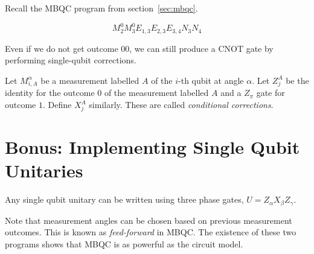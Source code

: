 \documentclass{article}
\begin{document}
Recall the MBQC program from section~\ref{sec:mbqc}.

\[ M_2^0 M_3^0 E_{1,3} E_{2,3} E_{3,4} N_3 N_4 \]

\medskip
{}
\medskip

Even if we do not get outcome $00$, we can still produce a CNOT gate by performing single-qubit corrections.

\medskip
{}
\medskip

Let $M_{i,A}^\alpha$ be a measurement labelled $A$ of the $i$-th qubit at angle $\alpha$. Let $Z_j^A$ be the identity for the outcome $0$ of the measurement labelled $A$ and a $Z_\pi$ gate for outcome $1$. Define $X_j^A$ similarly. These are called \textit{conditional corrections}.

\medskip
{}
\medskip

\section*{Bonus: Implementing Single Qubit Unitaries}

Any single qubit unitary can be written using three phase gates, $U = Z_\alpha X_\beta Z_\gamma$.

\medskip
{}
\medskip

Note that measurement angles can be chosen based on previous measurement outcomes. This is known as \textit{feed-forward} in MBQC. The existence of these two programs shows that MBQC is as powerful as the circuit model.
\end{document}
